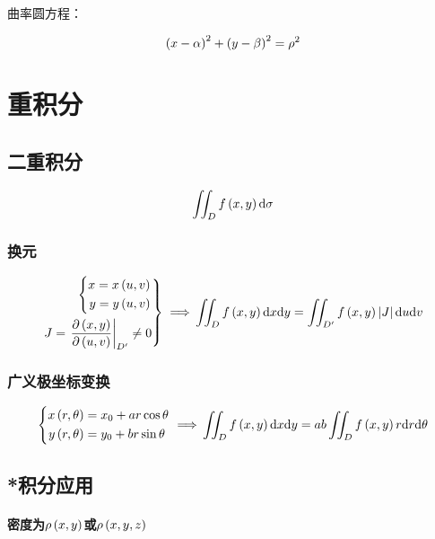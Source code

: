 \documentclass{article}
\begin{document}
曲率圆方程：

\[\left(x-\alpha\right)^2+\left(y-\beta\right)^2=\rho^2\]

\section{重积分}

\subsection{二重积分}

\begin{definition}[$\d\sigma=\d x\d y$]
    \[\iint_Df\left(x,y\right)\mathrm d\sigma\]
\end{definition}

\subsubsection{换元}

\[\left.\begin{aligned}
        \left\{\begin{aligned}
                   x=x\left(u,v\right) \\
                   y=y\left(u,v\right)
               \end{aligned}\right. \\
        J=\left.\frac{\partial\left(x,y\right)}{\partial\left(u,v\right)}\right|_{D^\prime}\neq0
    \end{aligned}\right\}\implies\\
    \iint_Df\left(x,y\right)\mathrm d x\mathrm d y=
    \iint_{D^\prime}f\left(x,y\right)\left|J\right|\mathrm d u\mathrm d v\]

\subsubsection{广义极坐标变换}

\[\left\{\begin{aligned}
        x\left(r,\theta\right) & =x_0+ar\cos\theta \\
        y\left(r,\theta\right) & =y_0+br\sin\theta
    \end{aligned}\right.\implies\\
    \iint_Df\left(x,y\right)\mathrm d x\mathrm d y=
    ab\iint_Df\left(x,y\right)r\mathrm d r\mathrm d\theta\]

\subsection{*积分应用}

\paragraph{密度为$\rho\left(x,y\right)$或$\rho\left(x,y,z\right)$}
\end{document}
